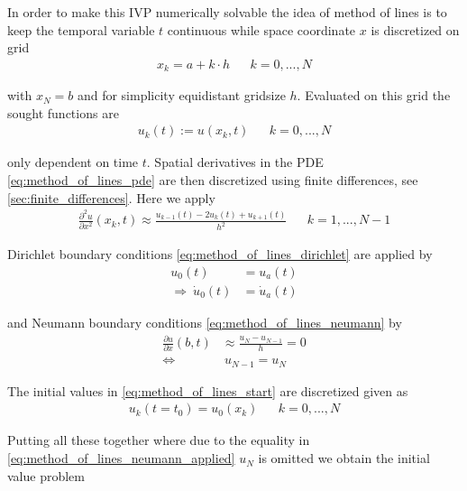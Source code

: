 \documentclass{scrartcl}[12pt, halfparskip]
\numberwithin{equation}{section}
\numberwithin{figure}{section}
\numberwithin{table}{section}
\begin{document}
In order to make this IVP numerically solvable the idea of method of lines is to keep the temporal variable $t$ continuous while space coordinate $x$ is discretized on grid
\begin{align}
	x_k = a + k \cdot h & & k=0,...,N
\end{align}

with $x_{N} = b$ and for simplicity equidistant gridsize $h$. Evaluated on this grid the sought functions are
\begin{align}
	u_k(t) := u(x_k,t) & & k=0,...,N
\end{align}

only dependent on time $t$. Spatial derivatives in the PDE \ref{eq:method_of_lines_pde} are then discretized using finite differences, see \cref{sec:finite_differences}. Here we apply
\begin{align}
	\frac{\partial^2 u}{\partial x^2}(x_k,t) \approx \frac{u_{k-1}(t) - 2 u_k(t) + u_{k+1}(t)}{h^2} & & k=1,...,N-1
	\label{eq:discretized_second_derivative}
\end{align}

Dirichlet boundary conditions \cref{eq:method_of_lines_dirichlet} are applied by
\begin{align}
	u_0(t) & = u_a(t) \\
	\Rightarrow \ \dot{u}_0(t) & = \dot{u}_a(t)
\end{align}

and Neumann boundary conditions \cref{eq:method_of_lines_neumann} by
\begin{align}
	\frac{\partial u}{\partial x}(b,t) & \approx \frac{u_{N} - u_{N-1}}{h} = 0 \nonumber \\
	\Leftrightarrow & \ u_{N-1} = u_{N} \label{eq:method_of_lines_neumann_applied}
\end{align}

The initial values in \cref{eq:method_of_lines_start} are discretized given as
\begin{align}
	u_k(t=t_0) = u_0(x_k) & & k = 0,...,N
\end{align}

Putting all these together where due to the equality in \cref{eq:method_of_lines_neumann_applied} $u_{N}$ is omitted we obtain the initial value problem 
\end{document}
